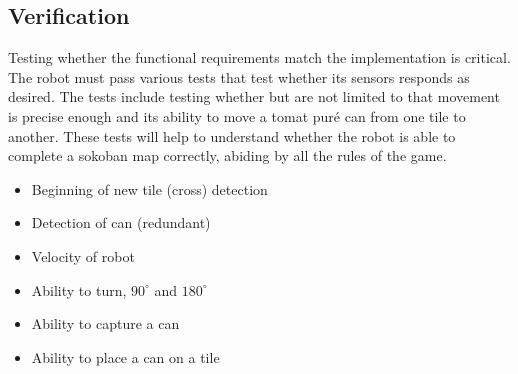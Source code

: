 \documentclass[../../main.tex]{subfiles}
\begin{document}
\subsection{Verification}%
\label{sub:verification}

Testing whether the functional requirements match the implementation is critical.
The robot must pass various tests that test whether its sensors responds as desired. The tests include testing whether but are not limited to that movement is precise enough and its ability to move a tomat puré can from one tile to another. These tests will help to understand whether the robot is able to complete a sokoban map correctly, abiding by all the rules of the game.

\begin{itemize}
	\item Beginning of new tile (cross) detection
	
	\item Detection of can (redundant)
	
	\item Velocity of robot
	
	\item Ability to turn, $90^{\circ}$ and $180^{\circ}$
	
	\item Ability to capture a can
	
	\item Ability to place a can on a tile
\end{itemize}


	
\end{document}
